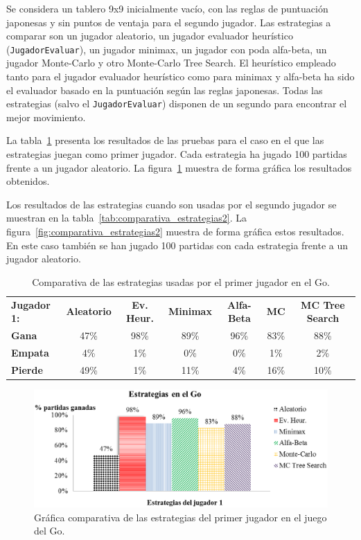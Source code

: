Se considera un tablero 9x9 inicialmente vacío, con las reglas de puntuación japonesas y sin puntos de ventaja para el segundo jugador.
Las estrategias a comparar son un jugador aleatorio, un jugador evaluador heurístico (\texttt{JugadorEvaluar}), un jugador minimax, un jugador con poda alfa-beta, un jugador Monte-Carlo y otro Monte-Carlo Tree Search.
El heurístico empleado tanto para el jugador evaluador heurístico como para minimax y alfa-beta ha sido el evaluador basado en la puntuación según las reglas japonesas.
Todas las estrategias (salvo el \texttt{JugadorEvaluar}) disponen de un segundo para encontrar el mejor movimiento.

La tabla~\ref{tab:comparativa_estrategias1} presenta los resultados de las pruebas para el caso en el que las estrategias juegan como primer jugador.
Cada estrategia ha jugado 100 partidas frente a un jugador aleatorio.
La figura~\ref{fig:comparativa_estrategias1} muestra de forma gráfica los resultados obtenidos.

Los resultados de las estrategias cuando son usadas por el segundo jugador se muestran en la tabla~\ref{tab:comparativa_estrategias2}.
La figura~\ref{fig:comparativa_estrategias2} muestra de forma gráfica estos resultados.
En este caso también se han jugado 100 partidas con cada estrategia frente a un jugador aleatorio.

\begin{table}[t]
\centering
\caption[Comparativa de estrategias en el Go (I)]{Comparativa de las estrategias usadas por el primer jugador en el Go.}
\label{tab:comparativa_estrategias1}
\begin{tabular}{lcccccc}
\hline
\textbf{Jugador 1:} & \textbf{Aleatorio} & \textbf{Ev. Heur.} & \textbf{Minimax} & \textbf{Alfa-Beta} & \textbf{MC} & \textbf{MC Tree Search} \\
\textbf{Gana} & 47\% & 98\% & 89\% & 96\% & 83\% & 88\% \\
\textbf{Empata} & 4\% & 1\% & 0\% & 0\% & 1\% & 2\% \\
\textbf{Pierde} & 49\% & 1\% & 11\% & 4\% & 16\% & 10\% \\
\hline
\end{tabular}
\end{table} 

\begin{figure}[!h]
	\centering
	\includegraphics[scale=0.3]{contenido/cap7/imagenes/estrategiasGo1.eps}
	\caption[Comparativa de estrategias en el Go (I)]{Gráfica comparativa de las estrategias del primer jugador en el juego del Go.}
	\label{fig:comparativa_estrategias1}
\end{figure} 

